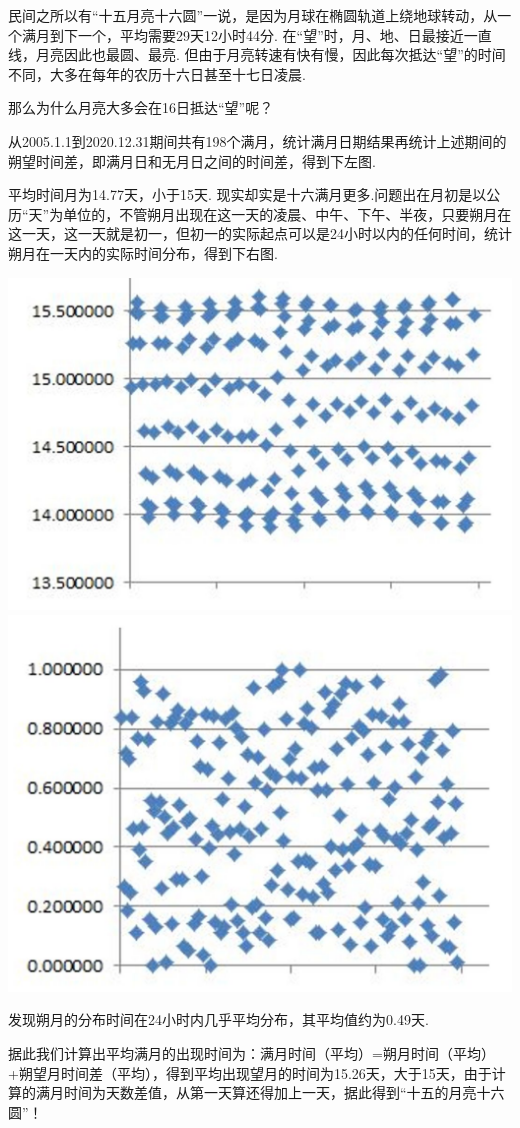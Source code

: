 \begin{multicols}{2}

\noindent{}

民间之所以有“十五月亮十六圆”一说，是因为月球在椭圆轨道上绕地球转动，从一个满月到下一个，平均需要29天12小时44分. 在“望”时，月、地、日最接近一直线，月亮因此也最圆、最亮. 但由于月亮转速有快有慢，因此每次抵达“望”的时间不同，大多在每年的农历十六日甚至十七日凌晨. 

那么为什么月亮大多会在16日抵达“望”呢？

从2005.1.1到2020.12.31期间共有198个满月，统计满月日期结果再统计上述期间的朔望时间差，即满月日和无月日之间的时间差，得到下左图.

平均时间月为14.77天，小于15天. 现实却实是十六满月更多.问题出在月初是以公历“天”为单位的，不管朔月出现在这一天的凌晨、中午、下午、半夜，只要朔月在这一天，这一天就是初一，但初一的实际起点可以是24小时以内的任何时间，统计朔月在一天内的实际时间分布，得到下右图.

\noindent\includegraphics[width=0.5\linewidth]{IMG/201910/191009.jpeg}\includegraphics[width=0.5\linewidth]{IMG/201910/191010.jpeg}
 
发现朔月的分布时间在24小时内几乎平均分布，其平均值约为0.49天. 

据此我们计算出平均满月的出现时间为：满月时间（平均）=朔月时间（平均）+朔望月时间差（平均），得到平均出现望月的时间为15.26天，大于15天，由于计算的满月时间为天数差值，从第一天算还得加上一天，据此得到“十五的月亮十六圆”！


\noindent{}


\end{multicols}
